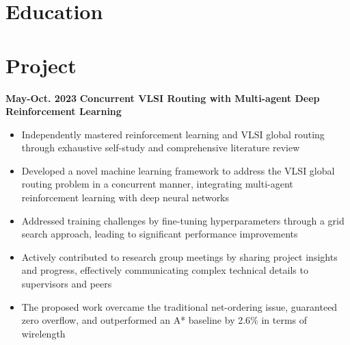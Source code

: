 \documentclass[11pt,a4paper,sans]{moderncv}
\begin{document}
\makecvtitle

\section{Education}

\section{Project}

\cventry
{\textnormal{\textbf{May-Oct. 2023}}}
{\textnormal{\textbf{Concurrent VLSI Routing with Multi-agent
Deep Reinforcement Learning}}}
{}{}{}
{
    \begin{itemize}
        \item Independently mastered reinforcement learning and VLSI global routing through exhaustive self-study and comprehensive literature review
        \item Developed a novel machine learning framework to address the VLSI global routing problem in a concurrent manner, integrating multi-agent reinforcement learning with deep neural networks
        \item Addressed training challenges by fine-tuning hyperparameters through a grid search approach, leading to significant performance improvements
        \item Actively contributed to research group meetings by sharing project insights and progress, effectively communicating complex technical details to supervisors and peers
        \item The proposed work overcame the traditional net-ordering issue, guaranteed zero overflow, and outperformed an A* baseline by 2.6\% in terms of wirelength
        \end{itemize}
}
\end{document}
